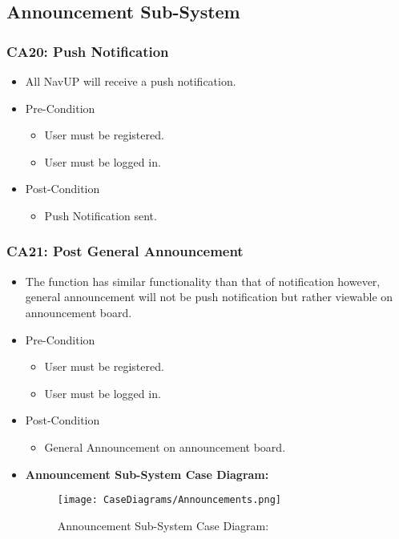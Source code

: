 \documentclass[12pt,a4paper]{article}
\begin{document}
	\subsection{Announcement Sub-System}
		\subsubsection{CA20: Push Notification}
			\begin{itemize}
				\item All NavUP will receive a push notification.
					\item Pre-Condition
						\begin{itemize}
							\item User must be registered.
							\item User must be logged in.
						\end{itemize}
					\item Post-Condition
						\begin{itemize}
							\item Push Notification sent.
						\end{itemize}
			\end{itemize}
		\subsubsection{CA21: Post General Announcement}
			\begin{itemize}
				\item The function has similar functionality than that of notification however, general announcement will not be push notification but rather viewable on announcement board.
					\item Pre-Condition
						\begin{itemize}
							\item User must be registered.
							\item User must be logged in.
						\end{itemize}
					\item Post-Condition
						\begin{itemize}
							\item General Announcement on announcement board.
						\end{itemize}
				\item \textbf{Announcement Sub-System Case Diagram:}
				\begin{figure}[H]
					\texttt{[image: CaseDiagrams/Announcements.png]}
					\caption{Announcement Sub-System Case Diagram:}
				\end{figure}
			\end{itemize}
\end{document}
